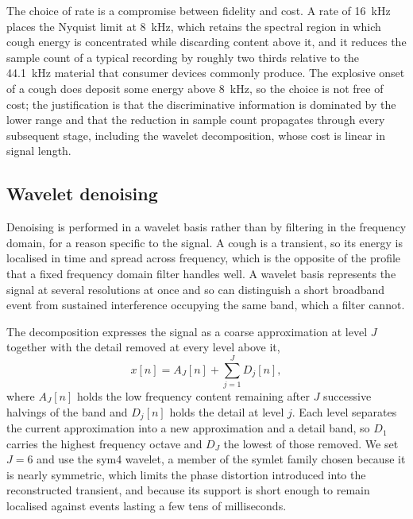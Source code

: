 The choice of rate is a compromise between fidelity and cost. A rate of
16~kHz places the Nyquist limit at 8~kHz, which retains the spectral region in
which cough energy is concentrated while discarding content above it, and it
reduces the sample count of a typical recording by roughly two thirds relative
to the 44.1~kHz material that consumer devices commonly produce. The explosive
onset of a cough does deposit some energy above 8~kHz, so the choice is not
free of cost; the justification is that the discriminative information is
dominated by the lower range and that the reduction in sample count propagates
through every subsequent stage, including the wavelet decomposition, whose
cost is linear in signal length.

\subsection{Wavelet denoising}\label{sec:d-wav}

Denoising is performed in a wavelet basis rather than by filtering in the
frequency domain, for a reason specific to the signal. A cough is a transient,
so its energy is localised in time and spread across frequency, which is the
opposite of the profile that a fixed frequency domain filter handles well. A
wavelet basis represents the signal at several resolutions at once and so can
distinguish a short broadband event from sustained interference occupying the
same band, which a filter cannot.

The decomposition expresses the signal as a coarse approximation at level $J$
together with the detail removed at every level above it,
\begin{equation}
x[n] = A_J[n] + \sum_{j=1}^{J} D_j[n],
\label{eq:mra}
\end{equation}
where $A_J[n]$ holds the low frequency content remaining after $J$ successive
halvings of the band and $D_j[n]$ holds the detail at level $j$. Each
level separates the current approximation into a new approximation and a
detail band, so $D_1$ carries the highest frequency octave and $D_J$ the
lowest of those removed. We set $J = 6$ and use the sym4 wavelet, a member of
the symlet family chosen because it is nearly symmetric, which limits the
phase distortion introduced into the reconstructed transient, and because its
support is short enough to remain localised against events lasting a few tens
of milliseconds.


